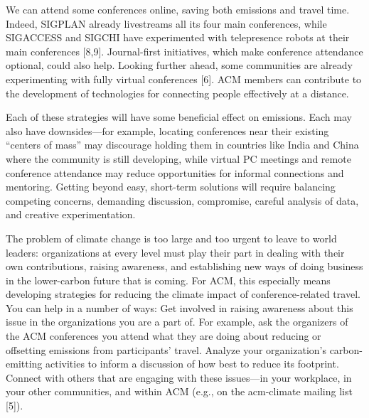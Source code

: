 \documentclass[12pt]{article}
\begin{document}
We can attend some conferences online, saving both emissions and travel
time.  Indeed, SIGPLAN already livestreams all its four main conferences,
while SIGACCESS and SIGCHI have experimented with telepresence robots at
their main conferences [8,9]. Journal-first initiatives, which make
conference attendance optional, could also help.  Looking further ahead,
some communities are already experimenting with fully virtual conferences
[6].  ACM members can contribute to the development of technologies for
connecting people effectively at a distance.

Each of these strategies will have some beneficial effect on emissions.
Each may also have downsides---for example, locating conferences near their
existing ``centers of mass'' may discourage holding them in countries like
India and China where the community is still developing, while virtual PC
meetings and remote conference attendance may reduce opportunities for
informal connections and mentoring.  Getting beyond easy, short-term
solutions will require balancing competing concerns, demanding discussion,
compromise, careful analysis of data, and creative experimentation.

The problem of climate change is too large and too urgent to leave to world
leaders: organizations at every level must play their part in dealing with
their own contributions, raising awareness, and establishing new ways of
doing business in the lower-carbon future that is coming. For ACM, this
especially means developing strategies for reducing the climate impact of
conference-related travel. You can help in a number of ways: Get involved in
raising awareness about this issue in the organizations you are a part of.
For example, ask the organizers of the ACM conferences you attend what they
are doing about reducing or offsetting emissions from participants’ travel.
Analyze your organization’s carbon-emitting activities to inform a
discussion of how best to reduce its footprint.  Connect with others that
are engaging with these issues---in your workplace, in your other
communities, and within ACM (e.g., on the acm-climate mailing list [5]).




\end{document}
